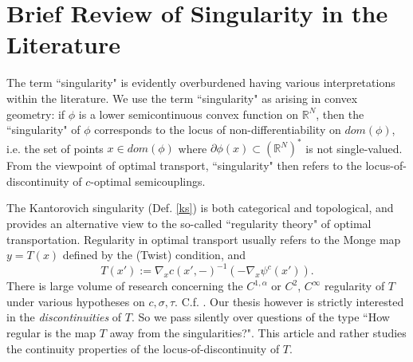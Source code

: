 \documentclass[12pt]{amsart}
\theoremstyle{definition}
\theoremstyle{remark}
\newcommand{\bR}{\mathbb{R}}
\newcommand{\del}{\partial}
\begin{document}









\section{Brief Review of Singularity in the Literature}
The term ``singularity" is evidently overburdened having various interpretations within the literature. We use the term ``singularity" as arising in convex geometry: if $\phi$ is a lower semicontinuous convex function on $\bR^N$, then the ``singularity" of $\phi$ corresponds to the locus of non-differentiability on $dom(\phi)$, i.e. the set of points $x\in dom(\phi)$ where $\del\phi(x)\subset (\bR^N)^*$ is not single-valued. From the viewpoint of optimal transport, 
``singularity" then refers to the locus-of-discontinuity of $c$-optimal semicouplings. 





The Kantorovich singularity (Def. \ref{ks}) is both categorical and topological, and provides an alternative view to the so-called ``regularity theory" of optimal transportation. Regularity in optimal transport usually refers to the Monge map $y=T(x)$ defined by the (Twist) condition, and $$T(x'):=\nabla_x c(x',-)^{-1} (-\nabla_x \psi^c(x')).$$ There is large volume of research concerning the $C^{1, \alpha}$ or $C^2$, $C^\infty$ regularity of $T$ under various hypotheses on $c, \sigma, \tau$. C.f. \cite[Ch.12]{Vil1}. Our thesis however is strictly interested in the \emph{discontinuities} of $T$. So we pass silently over questions of the type ``How regular is the map $T$ away from the singularities?". This article and \cite{martel} rather studies the continuity properties of the locus-of-discontinuity of $T$. 
\end{document}
